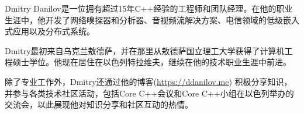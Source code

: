 Dmitry Danilov是一位拥有超过15年C++经验的工程师和团队经理。在他的职业生涯中，他开发了网络嗅探器和分析器、音视频流解决方案、电信领域的低级嵌入式应用以及分布式系统。

Dmitry最初来自乌克兰敖德萨，并在那里从敖德萨国立理工大学获得了计算机工程硕士学位。他现在居住在以色列特拉维夫，继续在他的技术职业生涯中前进。

除了专业工作外，Dmitry还通过他的博客(\url{https://ddanilov.me}) 积极分享知识，并参与各类技术社区活动，包括Core C++会议和Core C++小组在以色列举办的交流会，以此展现他对知识分享和社区互动的热情。
